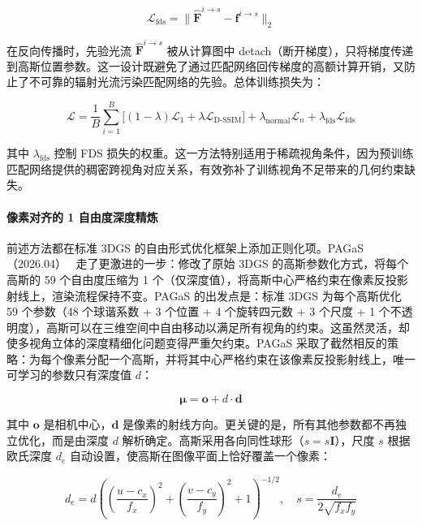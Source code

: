 \begin{equation}
\mathcal{L}_{\text{fds}} = \| \hat{\mathbf{F}}^{i \to s} - \mathbf{f}^{i \to s} \|_2
\end{equation}

在反向传播时，先验光流 $\hat{\mathbf{F}}^{i \to s}$ 被从计算图中 detach（断开梯度），只将梯度传递到高斯位置参数。这一设计既避免了通过匹配网络回传梯度的高额计算开销，又防止了不可靠的辐射光流污染匹配网络的先验。总体训练损失为：

\begin{equation}
\mathcal{L} = \frac{1}{B}\sum_{i=1}^{B} \big[(1-\lambda)\mathcal{L}_1 + \lambda \mathcal{L}_{\text{D-SSIM}}\big] + \lambda_{\text{normal}} \mathcal{L}_n + \lambda_{\text{fds}} \mathcal{L}_{\text{fds}}
\end{equation}

其中 $\lambda_{\text{fds}}$ 控制 FDS 损失的权重。这一方法特别适用于稀疏视角条件，因为预训练匹配网络提供的稠密跨视角对应关系，有效弥补了训练视角不足带来的几何约束缺失。

\paragraph{像素对齐的 1 自由度深度精炼}

前述方法都在标准 3DGS 的自由形式优化框架上添加正则化项。PAGaS（2026.04）~\cite{2604_22129} 走了更激进的一步：修改了原始 3DGS 的高斯参数化方式，将每个高斯的 59 个自由度压缩为 1 个（仅深度值），将高斯中心严格约束在像素反投影射线上，渲染流程保持不变。PAGaS 的出发点是：标准 3DGS 为每个高斯优化 59 个参数（48 个球谐系数 + 3 个位置 + 4 个旋转四元数 + 3 个尺度 + 1 个不透明度），高斯可以在三维空间中自由移动以满足所有视角的约束。这虽然灵活，却使多视角立体的深度精细化问题变得严重欠约束。PAGaS 采取了截然相反的策略：为每个像素分配一个高斯，并将其中心严格约束在该像素反投影射线上，唯一可学习的参数只有深度值 $d$：

\begin{equation}
    \boldsymbol{\mu} = \mathbf{o} + d \cdot \mathbf{d}
\end{equation}

其中 $\mathbf{o}$ 是相机中心，$\mathbf{d}$ 是像素的射线方向。更关键的是，所有其他参数都不再独立优化，而是由深度 $d$ 解析确定。高斯采用各向同性球形（$s = s\mathbf{I}$），尺度 $s$ 根据欧氏深度 $d_e$ 自动设置，使高斯在图像平面上恰好覆盖一个像素：

\begin{equation}
    d_e = d \left(\left(\frac{u - c_x}{f_x}\right)^2 + \left(\frac{v - c_y}{f_y}\right)^2 + 1\right)^{-1/2}, \quad s = \frac{d_e}{2\sqrt{f_x f_y}}
\end{equation}

